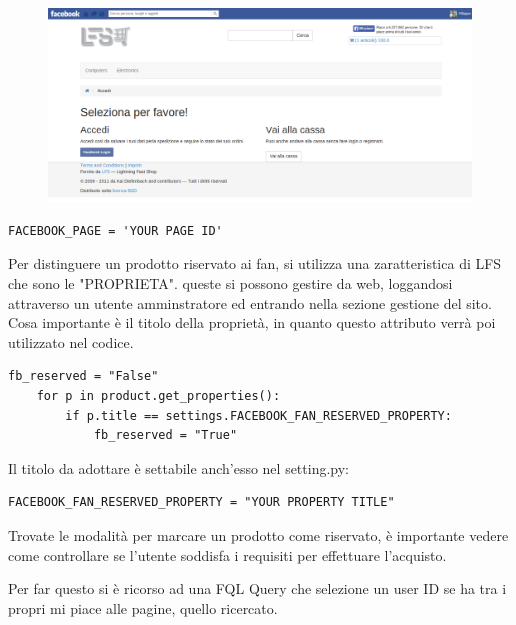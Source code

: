\begin{figure}
\includegraphics[width=0.9\columnwidth]{img/checkout}
\end{figure}

\begin{shaded}
\begin{lstlisting}
FACEBOOK_PAGE = 'YOUR PAGE ID'
\end{lstlisting}
\end{shaded}

Per distinguere un prodotto riservato ai fan, si utilizza una zaratteristica di LFS che sono le "PROPRIETA". queste si possono gestire da web, loggandosi attraverso un utente amminstratore ed entrando nella sezione gestione del sito. Cosa importante è il titolo della proprietà, in quanto questo attributo verrà poi utilizzato nel codice.

\begin{shaded}
\begin{lstlisting}
fb_reserved = "False"
    for p in product.get_properties():
        if p.title == settings.FACEBOOK_FAN_RESERVED_PROPERTY:
            fb_reserved = "True"
\end{lstlisting}
\end{shaded}

Il titolo da adottare è settabile anch'esso nel setting.py:

\begin{shaded}
\begin{lstlisting}
FACEBOOK_FAN_RESERVED_PROPERTY = "YOUR PROPERTY TITLE"
\end{lstlisting}
\end{shaded}

Trovate le modalità per marcare un prodotto come riservato, è importante vedere come controllare se l'utente soddisfa i requisiti per effettuare l'acquisto.

Per far questo si è ricorso ad una FQL Query che selezione un user ID se ha tra i propri mi piace alle pagine, quello ricercato.

